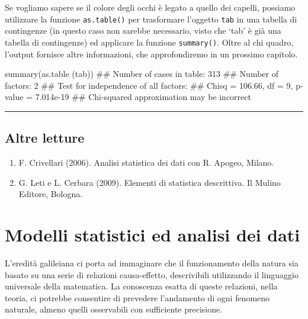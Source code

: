 \documentclass[a4paper,12pt,oneside]{book}
\providecommand{\tightlist}{%
  \setlength{\itemsep}{0pt}\setlength{\parskip}{0pt}}
\newenvironment{Shaded}{\begin{snugshade}}{\end{snugshade}}
\newcommand{\DocumentationTok}[1]{#1}
\newcommand{\FunctionTok}[1]{#1}
\newcommand{\NormalTok}[1]{#1}
\begin{document}
Se vogliamo sapere se il colore degli occhi è legato a quello dei capelli, possiamo utilizzare la funzione \texttt{as.table()} per trasformare l'oggetto \texttt{tab} in una tabella di contingenze (in questo caso non sarebbe necessario, visto che `tab' è già una tabella di contingenze) ed applicare la funzione \texttt{summary()}. Oltre al chi quadro, l'output fornisce altre informazioni, che approfondiremo in un prossimo capitolo.

\begin{Shaded}
\begin{Highlighting}[]
\FunctionTok{summary}\NormalTok{(}\FunctionTok{as.table}\NormalTok{ (tab))}
\DocumentationTok{\#\# Number of cases in table: 313 }
\DocumentationTok{\#\# Number of factors: 2 }
\DocumentationTok{\#\# Test for independence of all factors:}
\DocumentationTok{\#\#  Chisq = 106.66, df = 9, p{-}value = 7.014e{-}19}
\DocumentationTok{\#\#  Chi{-}squared approximation may be incorrect}
\end{Highlighting}
\end{Shaded}

\begin{center}\rule{0.5\linewidth}{0.5pt}\end{center}

\hypertarget{altre-letture-2}{%
\section{Altre letture}\label{altre-letture-2}}

\begin{enumerate}
\def\labelenumi{\arabic{enumi}.}
\tightlist
\item
  F. Crivellari (2006). Analisi statistica dei dati con R. Apogeo, Milano.
\item
  G. Leti e L. Cerbara (2009). Elementi di statistica descrittiva. Il Mulino Editore, Bologna.
\end{enumerate}

\hypertarget{modelli-statistici-ed-analisi-dei-dati}{%
\chapter{Modelli statistici ed analisi dei dati}\label{modelli-statistici-ed-analisi-dei-dati}}

L'eredità galileiana ci porta ad immaginare che il funzionamento della natura sia basato su una serie di relazioni causa-effetto, descrivibili utilizzando il linguaggio universale della matematica. La conoscenza esatta di queste relazioni, nella teoria, ci potrebbe consentire di prevedere l'andamento di ogni fenomeno naturale, almeno quelli osservabili con sufficiente precisione.
\end{document}
